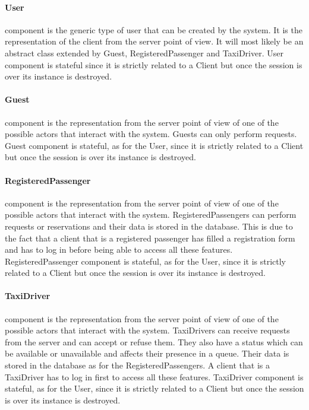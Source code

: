 		\paragraph{User} component is the generic type of user that can be created by the system. It is the representation of the client from the server point of view. It will most likely be an abstract class extended by Guest, RegisteredPassenger and TaxiDriver. User component is stateful since it is strictly related to a Client but once the session is over its instance is destroyed.
		\paragraph{Guest} component is the representation from the server point of view of one of the possible actors that interact with the system. Guests can only perform requests. Guest component is stateful, as for the User, since it is strictly related to a Client but once the session is over its instance is destroyed.
		\paragraph{RegisteredPassenger} component is the representation from the server point of view of one of the possible actors that interact with the system. RegisteredPassengers can perform requests or reservations and their data is stored in the database. This is due to the fact that a client that is a registered passenger has filled a registration form and has to log in before being able to access all these features. RegisteredPassenger component is stateful, as for the User, since it is strictly related to a Client but once the session is over its instance is destroyed.
		\paragraph{TaxiDriver} component is the representation from the server point of view of one of the possible actors that interact with the system. TaxiDrivers can receive requests from the server and can accept or refuse them. They also have a status which can be available or unavailable and affects their presence in a queue. Their data is stored in the database as for the RegisteredPassengers. A client that is a TaxiDriver has to log in first to access all these features. TaxiDriver component is stateful, as for the User, since it is strictly related to a Client but once the session is over its instance is destroyed.
